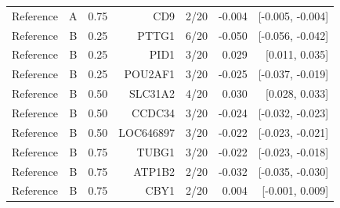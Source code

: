 \begin{longtable}{lrrrrrr}
Reference & A & 0.75 & CD9 & 2/20 & -0.004 & [-0.005, -0.004] \\
Reference & B & 0.25 & PTTG1 & 6/20 & -0.050 & [-0.056, -0.042] \\
Reference & B & 0.25 & PID1 & 3/20 & 0.029 & [0.011, 0.035] \\
Reference & B & 0.25 & POU2AF1 & 3/20 & -0.025 & [-0.037, -0.019] \\
Reference & B & 0.50 & SLC31A2 & 4/20 & 0.030 & [0.028, 0.033] \\
Reference & B & 0.50 & CCDC34 & 3/20 & -0.024 & [-0.032, -0.023] \\
Reference & B & 0.50 & LOC646897 & 3/20 & -0.022 & [-0.023, -0.021] \\
Reference & B & 0.75 & TUBG1 & 3/20 & -0.022 & [-0.023, -0.018] \\
Reference & B & 0.75 & ATP1B2 & 2/20 & -0.032 & [-0.035, -0.030] \\
Reference & B & 0.75 & CBY1 & 2/20 & 0.004 & [-0.001, 0.009] \\
\bottomrule
\end{longtable}
